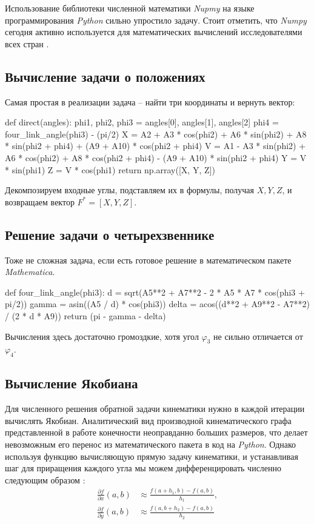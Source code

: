 Использование библиотеки численной математики \textit{Nupmy} на языке программирования \textit{Python} сильно упростило задачу. Стоит отметить, что \textit{Numpy} сегодня активно используется для математических вычислений исследователями всех стран \cite{Numpy2020}.

\subsection{Вычисление задачи о положениях}

Самая простая в реализации задача -- найти три координаты и вернуть вектор:
\begin{python}
def direct(angles):
    phi1, phi2, phi3 = angles[0], angles[1], angles[2]
    phi4 = four_link_angle(phi3) - (pi/2)
    X = A2 + A3 * cos(phi2) + A6 * sin(phi2) + A8 * sin(phi2 + phi4) + (A9 + A10) * cos(phi2 + phi4)
    V = A1 - A3 * sin(phi2) + A6 * cos(phi2) + A8 * cos(phi2 + phi4) - (A9 + A10) * sin(phi2 + phi4)
    Y = V * sin(phi1)
    Z = V * cos(phi1)
    return np.array([X, Y, Z])
\end{python}

\noindent Декомпозируем входные углы, подставляем их в формулы, получая $ X, Y, Z $, и возвращаем вектор $ F^* =[ X, Y, Z ] $.

\subsection{Решение задачи о четырехзвеннике}
Тоже не сложная задача, если есть готовое решение в математическом пакете \textit{Mathematica}.
\begin{python}
def four_link_angle(phi3):
    d = sqrt(A5**2 + A7**2 - 2 * A5 * A7 * cos(phi3 + pi/2))
    gamma = asin((A5 / d) * cos(phi3))
    delta = acos((d**2 + A9**2 - A7**2) / (2 * d * A9))
    return (pi - gamma - delta)
\end{python}

\noindent Вычисления здесь достаточно громоздкие, хотя угол $ \varphi_3 $ не сильно отличается от $ \varphi_4 $.

\subsection{Вычисление Якобиана}
Для численного решения обратной задачи кинематики нужно в каждой итерации вычислять Якобиан. Аналитический вид производной кинематического графа представленной в работе конечности неоправданно больших размеров, что делает невозможным его перенос из математического пакета в код на \textit{Python}. Однако используя функцию вычисляющую прямую задачу кинематики, и устанавливая шаг для приращения каждого угла мы можем дифференцировать численно следующим образом \cite{Morken2010}:
\begin{align*}
    \frac{\partial f}{\partial x}(a, b) &\approx \frac{f(a+h_1, b) - f(a, b)}{h_1}, \\ 
    \frac{\partial f}{\partial y}(a, b) &\approx \frac{f(a, b+h_2) - f(a, b)}{h_2}
\end{align*}

